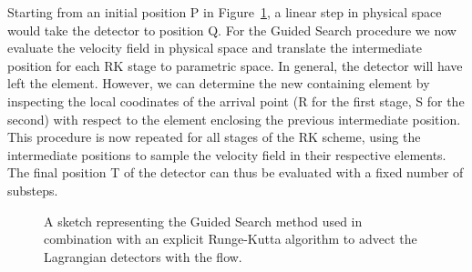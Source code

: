 Starting from an initial position P in Figure~\ref{fig:guided_search_menthod}, a linear step in physical space would take the detector to position Q.
For the Guided Search procedure we now evaluate the velocity field in physical space and translate the intermediate position for each RK stage to parametric space.
In general, the detector will have left the element. However, we can determine the new containing element by inspecting the local coodinates of the arrival point
(R for the first stage, S for the second) with respect to the element enclosing the previous intermediate position.
This procedure is now repeated for all stages of the RK scheme, using the intermediate positions to sample the velocity field in their respective elements.
The final position T of the detector can thus be evaluated with a fixed number of substeps.

\begin{figure}[ht]
  \centering
  \caption{A sketch representing the Guided Search method used in combination with an explicit Runge-Kutta algorithm to advect the Lagrangian detectors with the flow.}
  \label{fig:guided_search_menthod}
\end{figure}
